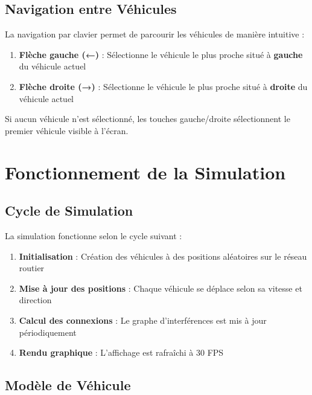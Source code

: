 \documentclass[12pt,a4paper]{article}
\begin{document}
\subsection{Navigation entre Véhicules}

La navigation par clavier permet de parcourir les véhicules de manière intuitive :

\begin{enumerate}
    \item \textbf{Flèche gauche (←)} : Sélectionne le véhicule le plus proche situé à \textbf{gauche} du véhicule actuel
    \item \textbf{Flèche droite (→)} : Sélectionne le véhicule le plus proche situé à \textbf{droite} du véhicule actuel
\end{enumerate}

\begin{warningbox}
Si aucun véhicule n'est sélectionné, les touches gauche/droite sélectionnent le premier véhicule visible à l'écran.
\end{warningbox}

\section{Fonctionnement de la Simulation}

\subsection{Cycle de Simulation}

La simulation fonctionne selon le cycle suivant :

\begin{enumerate}
    \item \textbf{Initialisation} : Création des véhicules à des positions aléatoires sur le réseau routier
    \item \textbf{Mise à jour des positions} : Chaque véhicule se déplace selon sa vitesse et direction
    \item \textbf{Calcul des connexions} : Le graphe d'interférences est mis à jour périodiquement
    \item \textbf{Rendu graphique} : L'affichage est rafraîchi à 30 FPS
\end{enumerate}

\subsection{Modèle de Véhicule}
\end{document}
